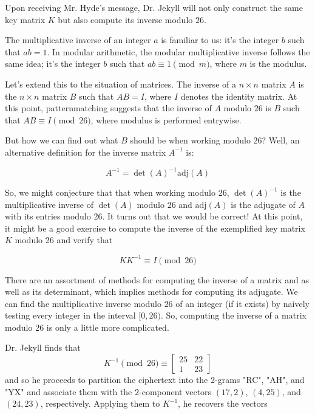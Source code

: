\documentclass{paper}
\newenvironment{aside}[2][Aside:]{\begin{trivlist}
\item[\hskip \labelsep {\bfseries #1}\hskip \labelsep {\bfseries #2.}]}{\end{trivlist}}
\newenvironment{gbox}{\begin{tcolorbox}[breakable,colback=green!20!white,colframe=green!10!black]}{\end{tcolorbox}}
\begin{document}
\medskip
Upon receiving Mr. Hyde's message, Dr. Jekyll will not only construct the same key matrix $K$ but also compute its inverse modulo $26$. 

\bigskip
\begin{gbox}
    \begin{aside}{Inverse modulo 26}
    
        The multiplicative inverse of an integer $a$ is familiar to us: it's the integer $b$ such that $ab = 1$. In modular arithmetic, the modular multiplicative inverse follows the same idea; it's the integer $b$ such that $ab \equiv 1 \pmod{m}$, where $m$ is the modulus.
        
        \medskip
        Let's extend this to the situation of matrices. The inverse of a $n \times n$ matrix $A$ is the $n \times n$ matrix $B$ such that $AB = I$, where $I$ denotes the identity matrix. At this point, patternmatching suggests that the inverse of $A$ modulo $26$ is $B$ such that $AB \equiv I \pmod{26}$, where modulus is performed entrywise.
        
        \medskip
        But how we can find out what $B$ should be when working modulo $26$? Well, an alternative definition for the inverse matrix $A^{-1}$ is:
        
        \[ A^{-1} = \det(A)^{-1} \mathrm{adj}(A) \]
        
        So, we might conjecture that that when working modulo 26, $\det(A) ^{-1}$ is the multiplicative inverse of $\det(A)$ modulo 26 and $\mathrm{adj}(A)$ is the adjugate of $A$ with its entries modulo 26. It turns out that we would be correct! At this point, it might be a good exercise to compute the inverse of the exemplified key matrix $K$ modulo 26 and verify that 
        
        \[ KK^{-1} \equiv I \pmod{26} \]
        
        \medskip
        There are an assortment of methods for computing the inverse of a matrix and as well as its determinant, which implies methods for computing its adjugate. We can find the multiplicative inverse modulo $26$ of an integer (if it exists) by naively testing every integer in the interval $[0, 26)$. So, computing the inverse of a matrix modulo $26$ is only a little more complicated. 
    \end{aside}
\end{gbox}

\bigskip
Dr. Jekyll finds that 
    \[ K^{-1} \pmod{26} \equiv \begin{bmatrix}
                    25 & 22 \\
                    1 & 23 
                \end{bmatrix} \]
and so he proceeds to partition the ciphertext into the 2-grams "RC", "AH", and "YX" and associate them with the $2$-component vectors $(17, 2)$, $(4, 25)$, and $(24, 23)$, respectively. Applying them to $K^{-1}$, he recovers the vectors
                
\end{document}
